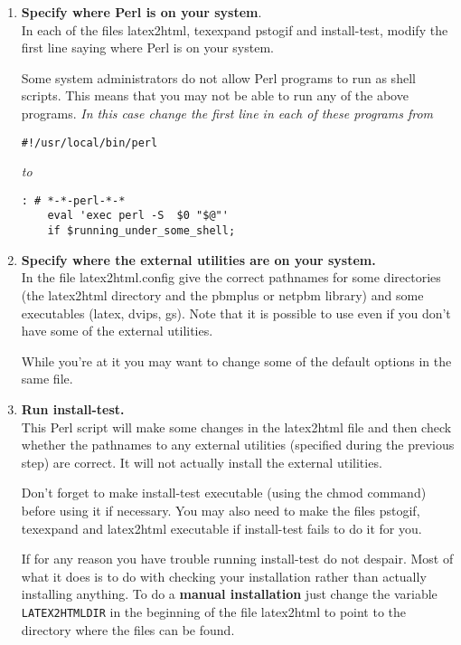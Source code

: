 \begin{enumerate}
\item {\bf Specify where Perl is on your system}. \\
In each of the files {\fn latex2html}, {\fn texexpand} {\fn pstogif}
and  {\fn install-test},
modify the first line saying where Perl is on your system. 

Some system administrators do not allow Perl programs to run as shell
scripts. This means that you may not be able to run any of the above
programs. {\em In this case change the first line in each of these
programs from}
\begin{verbatim}
#!/usr/local/bin/perl
\end{verbatim}

{\em to}

\begin{verbatim}
: # *-*-perl-*-*
    eval 'exec perl -S  $0 "$@"'
    if $running_under_some_shell; 
\end{verbatim}

\item {\bf Specify where the external utilities are on your system.} \\
In the file {\fn latex2html.config} give the correct pathnames for 
some directories (the {\fn latex2html} directory and the {\fn 
pbmplus} or {\fn netpbm} library) and some executables ({\fn latex, dvips, gs}). 
Note that it is
possible 
to use \latextohtml even
if you don't have some of the external utilities.

While you're at it you may want to change some of the default 
options in the same file.

\item {\bf Run {\fn install-test}.} \\
This Perl script will make some changes in the {\fn latex2html} file
and then check whether the pathnames to any external utilities
(specified during the previous step) are correct. It will not actually
install the external utilities. 

Don't forget to make {\fn
install-test} executable (using the {\fn chmod} command) before
using it if necessary. You may also need to make the files
{\fn pstogif}, {\fn texexpand} and {\fn latex2html} executable 
if {\fn install-test} fails to do it for you.

If for any reason you have trouble running {\fn install-test}
do not despair. Most of what it does is to do with checking
your installation rather than actually installing anything.
To do a {\bf manual installation} just change the variable
{\tt LATEX2HTMLDIR} in the beginning of the file {\fn latex2html}
to point to the directory where the \latextohtml files can be found.
\end{enumerate}

